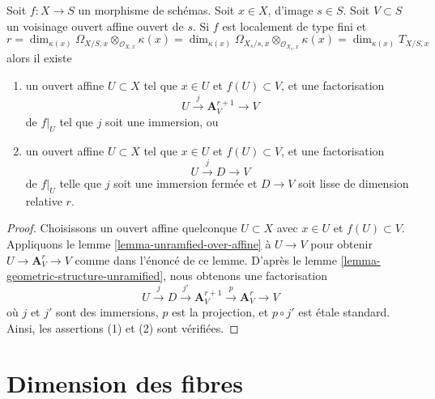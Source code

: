 \begin{lemma}
\label{lemma-immersion-into-affine}
Soit $f : X \to S$ un morphisme de
schémas. Soit $x \in X$, d'image $s
\in S$. Soit $V \subset S$ un voisinage ouvert affine
ouvert de $s$. Si $f$ est localement de type fini et
$$
r =
\dim_{\kappa(x)} \Omega_{X/S, x} \otimes_{\mathcal{O}_{X, x}} \kappa(x) =
\dim_{\kappa(x)} \Omega_{X_s/s, x} \otimes_{\mathcal{O}_{X_s, x}} \kappa(x) =
\dim_{\kappa(x)} T_{X/S, x}
$$
alors il existe
\begin{enumerate}
\item un ouvert affine $U \subset X$ tel que $x \in U$ et $f(U) \subset V$, et une
factorisation
$$
U \xrightarrow{j} \mathbf{A}^{r + 1}_V \to V
$$
de $f|_U$ tel que $j$ soit une immersion, ou
\item un ouvert affine $U \subset X$ tel que $x \in U$ et $f(U) \subset V$, et une
factorisation
$$
U \xrightarrow{j} D \to V
$$
de $f|_U$ telle que $j$ soit une immersion fermée et $D \to V$
soit lisse de dimension relative $r$.
\end{enumerate}
\end{lemma}

\begin{proof}
Choisissons un ouvert affine quelconque $U \subset X$ avec $x \in U$ et
$f(U) \subset V$. Appliquons le lemme
\ref{lemma-unramfied-over-affine} à $U \to V$ pour obtenir $U \to
\mathbf{A}^r_V \to V$ comme dans l'énoncé de ce lemme. D'après le lemme
\ref{lemma-geometric-structure-unramified}, nous obtenons une factorisation
$$
U \xrightarrow{j} D \xrightarrow{j'} \mathbf{A}^{r + 1}_V
\xrightarrow{p} \mathbf{A}^r_V \to V
$$
où $j$ et $j'$ sont des immersions, $p$ est la
projection, et $p \circ j'$ est étale standard.
Ainsi, les assertions (1) et (2) sont vérifiées.
\end{proof}





\section{Dimension des fibres}
\label{section-dimension-fibres}

